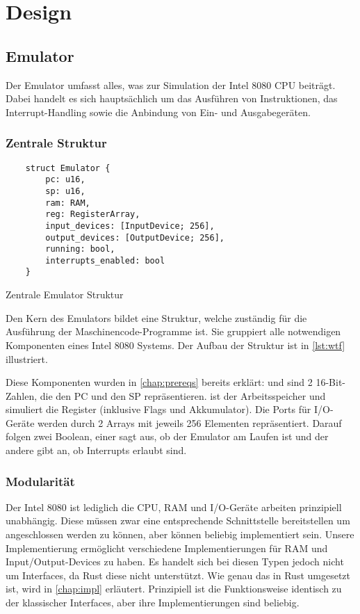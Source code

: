 \chapter{Design}\label{chap:design}

\section{Emulator}

Der Emulator umfasst alles, was zur Simulation der Intel 8080 CPU beiträgt. Dabei handelt es sich hauptsächlich um das Ausführen von Instruktionen, das Interrupt-Handling sowie die Anbindung von Ein- und Ausgabegeräten.

\subsection{Zentrale Struktur}

\begin{listing}[ht]
\begin{verbatim}
    struct Emulator {
        pc: u16,
        sp: u16,
        ram: RAM,
        reg: RegisterArray,
        input_devices: [InputDevice; 256],
        output_devices: [OutputDevice; 256],
        running: bool,
        interrupts_enabled: bool
    }
\end{verbatim}
\centering
\caption{Zentrale Emulator Struktur}
\label{lst:wtf}
\end{listing}

Den Kern des Emulators bildet eine Struktur, welche zuständig für die Ausführung der Maschinencode-Programme ist. Sie gruppiert alle notwendigen Komponenten eines Intel 8080 Systems. Der Aufbau der Struktur ist in \cref{lst:wtf} illustriert.

Diese Komponenten wurden in \cref{chap:prereqs} bereits erklärt:  und  sind 2 16-Bit-Zahlen, die den \ac{PC} und den \ac{SP} repräsentieren.  ist der Arbeitsspeicher und  simuliert die Register (inklusive Flags und Akkumulator).
Die Ports für I/O-Geräte werden durch 2 Arrays mit jeweils 256 Elementen repräsentiert.
Darauf folgen zwei Boolean, einer sagt aus, ob der Emulator am Laufen ist und der andere gibt an, ob Interrupts erlaubt sind.


\subsection{Modularität}

Der Intel 8080 ist lediglich die CPU, RAM und I/O-Geräte arbeiten prinzipiell unabhängig. Diese müssen zwar eine entsprechende Schnittstelle bereitstellen um angeschlossen werden zu können, aber können beliebig implementiert sein. Unsere Implementierung ermöglicht verschiedene Implementierungen für RAM und Input/Output-Devices zu haben. Es handelt sich bei diesen Typen jedoch nicht um Interfaces, da Rust diese nicht unterstützt. Wie genau das in Rust umgesetzt ist, wird in \cref{chap:impl} erläutert. Prinzipiell ist die Funktionsweise identisch zu der klassischer Interfaces, aber ihre Implementierungen sind beliebig.

